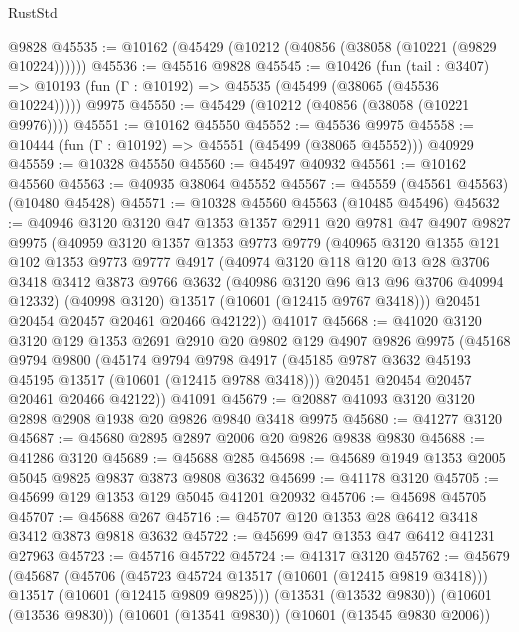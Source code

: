 \begin{lexlean}{RustStd}
\begin{coremodule}
    @9828
@45535 := @10162 (@45429 (@10212 (@40856 (@38058 (@10221 (@9829 @10224))))))
@45536 := @45516 @9828
@45545 := @10426
    (fun (tail : @3407) => @10193 (fun (Γ : @10192) => @45535 (@45499 (@38065 (@45536 @10224)))))
    @9975
@45550 := @45429 (@10212 (@40856 (@38058 (@10221 @9976))))
@45551 := @10162 @45550
@45552 := @45536 @9975
@45558 := @10444 (fun (Γ : @10192) => @45551 (@45499 (@38065 @45552))) @40929
@45559 := @10328 @45550
@45560 := @45497 @40932
@45561 := @10162 @45560
@45563 := @40935 @38064 @45552
@45567 := @45559 (@45561 @45563) (@10480 @45428)
@45571 := @10328 @45560 @45563 (@10485 @45496)
@45632 := @40946
    @3120
    @3120
    @47
    @1353
    @1357
    @2911
    @20
    @9781
    @47
    @4907
    @9827
    @9975
    (@40959
      @3120
      @1357
      @1353
      @9773
      @9779
      (@40965
        @3120
        @1355
        @121
        @102
        @1353
        @9773
        @9777
        @4917
        (@40974
          @3120
          @118
          @120
          @13
          @28
          @3706
          @3418
          @3412
          @3873
          @9766
          @3632
          (@40986 @3120 @96 @13 @96 @3706 @40994 @12332)
          (@40998 @3120)
          @13517
          (@10601 (@12415 @9767 @3418)))
        @20451
        @20454
        @20457
        @20461
        @20466
        @42122))
    @41017
@45668 := @41020
    @3120
    @3120
    @129
    @1353
    @2691
    @2910
    @20
    @9802
    @129
    @4907
    @9826
    @9975
    (@45168
      @9794
      @9800
      (@45174
        @9794
        @9798
        @4917
        (@45185 @9787 @3632 @45193 @45195 @13517 (@10601 (@12415 @9788 @3418)))
        @20451
        @20454
        @20457
        @20461
        @20466
        @42122))
    @41091
@45679 := @20887 @41093 @3120 @3120 @2898 @2908 @1938 @20 @9826 @9840 @3418 @9975
@45680 := @41277 @3120
@45687 := @45680 @2895 @2897 @2006 @20 @9826 @9838 @9830
@45688 := @41286 @3120
@45689 := @45688 @285
@45698 := @45689 @1949 @1353 @2005 @5045 @9825 @9837 @3873 @9808 @3632
@45699 := @41178 @3120
@45705 := @45699 @129 @1353 @129 @5045 @41201 @20932
@45706 := @45698 @45705
@45707 := @45688 @267
@45716 := @45707 @120 @1353 @28 @6412 @3418 @3412 @3873 @9818 @3632
@45722 := @45699 @47 @1353 @47 @6412 @41231 @27963
@45723 := @45716 @45722
@45724 := @41317 @3120
@45762 := @45679
    (@45687
      (@45706
        (@45723 @45724 @13517 (@10601 (@12415 @9819 @3418)))
        @13517
        (@10601 (@12415 @9809 @9825)))
      (@13531 (@13532 @9830))
      (@10601 (@13536 @9830))
      (@10601 (@13541 @9830))
      (@10601 (@13545 @9830 @2006))

\end{coremodule}
\end{lexlean}
